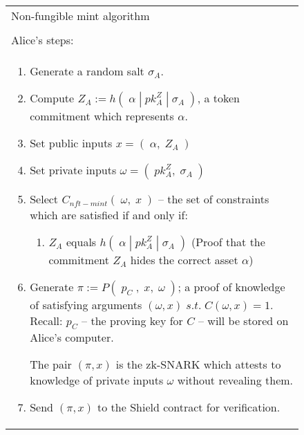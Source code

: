 \documentclass{article}
\begin{document}
\newpage
\begin{figure}[H]
	\begin{center}
		\begin{framed}
      \begin{tabular}{p{16cm}}
        Non-fungible mint algorithm \\
        \\
        \hline
        Alice's steps:\\
        \begin{enumerate}
				  \item Generate a random salt $\sigma_{A}$.
				  \item Compute $Z_A := h(\;\alpha\;|\;pk^Z_A\;|\;\sigma_{A}\;)$, a token commitment which represents $\alpha$.
          \item Set public inputs $x = (\;\alpha,\;Z_A\;)$
          \item Set private inputs $\omega = (\;pk_A^Z,\;\sigma_{A}\;)$
          \item Select $C_{nft-mint}(\;\omega,\;x\;)$ -- the set of constraints which are satisfied if and only if:
          \begin{enumerate}
            \item $Z_A$ equals $h(\;\alpha\;|\;pk_A^Z\;|\;\sigma_A\;)$ (Proof that the commitment $Z_A$ hides the correct asset $\alpha$)
          \end{enumerate}
          \item Generate $\pi := P(\;p_C\;,\;x,\;\omega\;)$; a proof of knowledge of satisfying arguments $(\omega, x)\;s.t.\;C(\omega, x) = 1$. Recall: $p_C$ -- the proving key for $C$ -- will be stored on Alice's computer.

          The pair $(\pi, x)$ is the zk-SNARK which attests to knowledge of private inputs $\omega$ without revealing them.
          \item Send $(\pi, x)$ to the Shield contract for verification.


\end{enumerate}
\end{tabular}
\end{framed}
\end{center}
\end{figure}
\end{document}

